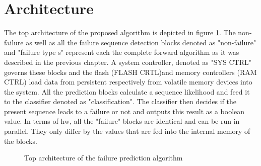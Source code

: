 \documentclass[mscthesis]{usiinfthesis}
\begin{document}
\section{Architecture}
\label{ch:design_arch}

The top architecture of the proposed algorithm is depicted in figure
\ref{fig:arch_top}. The non-failure as well as all the failure sequence
detection blocks denoted as "non-failure" and "failure type s" represent each
the complete forward algorithm as it was described in the previous chapter.
A system controller, denoted as "SYS CTRL" governs these blocks and the flash
(FLASH CRTL)and memory controllers (RAM CTRL) load data from persistent
respectively from volatile memory devices into the system. All the prediction
blocks calculate a sequence likelihood and feed it to the classifier denoted as
"classification". The classifier then decides if the present sequence leads to
a failure or not and outputs this result as a boolean value. In terms of
\gls{hw}, all the "failure" blocks are identical and can be run in parallel.
They only differ by the values that are fed into the internal memory of the
blocks.

\begin{figure}
    \centering
    
    \caption{Top architecture of the failure prediction algorithm}
    \label{fig:arch_top}
\end{figure}
\end{document}
